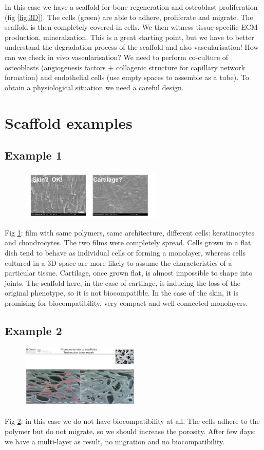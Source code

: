 In this case we have a scaffold for bone regeneration and osteoblast proliferation (fig \ref{fig:3D}).  The cells (green) are able to adhere, proliferate and migrate. The scaffold is then completely covered in cells. We then witness tissue-specific ECM production, mineralzation. This is a great starting point, but we have to better understand the degradation process of the scaffold and also vascularisation!
How can we check in vivo vascularisation? We need to perform co-culture of osteoblasts (angiogenesis factors + collagenic structure for capillary network formation) and endothelial cells (use empty spaces to assemble as a tube). To obtain a physiological situation we need a careful design.

\section{Scaffold examples}
\subsection{Example 1}
\begin{figure}[h]
\centering
\includegraphics[width=0.6\textwidth]{sk_car.jpg}
\caption{\label{fig:sk_car}}
\end{figure}
Fig \ref{fig:sk_car}: film with same polymers, same architecture, different cells: keratinocytes and chondrocytes. The two films were completely spread.
Cells grown in a flat dish tend to behave as individual cells or forming a monolayer, whereas cells cultured in a 3D space are more likely to assume the characteristics of a particular tissue. 
Cartilage, once grown flat, is almost impossible to shape into joints. The scaffold here, in the case of cartilage, is inducing the loss of the original phenotype,  so it is not biocompatible.
In the case of the skin, it is promising for biocompatibility, very compact and well connected monolayers.

\subsection{Example 2}
\begin{figure}[h]
\centering
\includegraphics[width=0.5\textwidth]{bone.jpg}
\caption{\label{fig:bone}}
\end{figure}
Fig \ref{fig:bone}: in this case we do not have biocompatibility at all. The cells adhere to the polymer but do not migrate, so we should increase the porosity. 
After few days: we have a multi-layer as result, no migration and no biocompatibility. 

